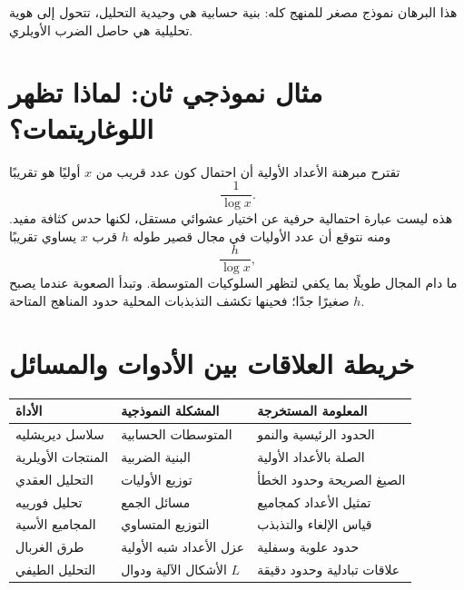 \begin{remark}
هذا البرهان نموذج مصغر للمنهج كله: بنية حسابية هي وحيدية التحليل، تتحول إلى هوية تحليلية هي حاصل الضرب الأويلري.
\end{remark}

\section{مثال نموذجي ثان: لماذا تظهر اللوغاريتمات؟}

تقترح مبرهنة الأعداد الأولية أن احتمال كون عدد قريب من \(x\) أوليًا هو تقريبًا
\[
\frac{1}{\log x}.
\]
هذه ليست عبارة احتمالية حرفية عن اختيار عشوائي مستقل، لكنها حدس كثافة مفيد. ومنه نتوقع أن عدد الأوليات في مجال قصير طوله \(h\) قرب \(x\) يساوي تقريبًا
\[
\frac{h}{\log x},
\]
ما دام المجال طويلًا بما يكفي لتظهر السلوكيات المتوسطة. وتبدأ الصعوبة عندما يصبح \(h\) صغيرًا جدًا؛ فحينها تكشف التذبذبات المحلية حدود المناهج المتاحة.

\section{خريطة العلاقات بين الأدوات والمسائل}

\begin{center}
\begin{tabular}{|p{}|p{}|p{}|}
\hline
\textbf{الأداة} & \textbf{المشكلة النموذجية} & \textbf{المعلومة المستخرجة} \\
\hline
سلاسل ديريشليه & المتوسطات الحسابية & الحدود الرئيسية والنمو \\
\hline
المنتجات الأويلرية & البنية الضربية & الصلة بالأعداد الأولية \\
\hline
التحليل العقدي & توزيع الأوليات & الصيغ الصريحة وحدود الخطأ \\
\hline
تحليل فورييه & مسائل الجمع & تمثيل الأعداد كمجاميع \\
\hline
المجاميع الأسية & التوزيع المتساوي & قياس الإلغاء والتذبذب \\
\hline
طرق الغربال & عزل الأعداد شبه الأولية & حدود علوية وسفلية \\
\hline
التحليل الطيفي & الأشكال الآلية ودوال \(L\) & علاقات تبادلية وحدود دقيقة \\
\hline
\end{tabular}
\end{center}


